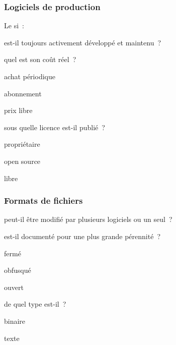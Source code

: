 \subsubsection{Logiciels de production}

Le \gls{si} :
\begin{itmz}
\item{est-il toujours activement développé et maintenu ?}
\item{quel est son coût réel ?
    \begin{itmz}
    \item{achat périodique}
    \item{abonnement}
    \item{prix libre}
    \end{itmz}
}
\item{sous quelle licence est-il publié ?
    \begin{itmz}
    \item{propriétaire}
    \item{open source}
    \item{libre}
    \end{itmz}
}
\end{itmz}

\subsubsection{Formats de fichiers}

\begin{itmz}
\item{peut-il être modifié par plusieurs logiciels ou un seul ?}
\item{est-il documenté pour une plus grande pérennité ?
    \begin{itmz}
    \item{fermé}
    \item{obfusqué}
    \item{ouvert}
    \end{itmz}
}
\item{de quel type est-il ?
    \begin{itmz}
    \item{binaire}
    \item{texte}
    \end{itmz}
}
\end{itmz}

\pagebreak
